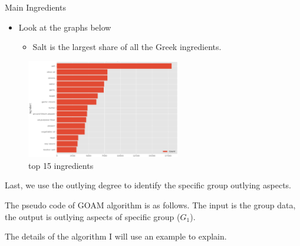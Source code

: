 \documentclass[
 size=14pt,
 paper=smartboard,  %
 mode=present, 		%
 display=slides, 	%
 style=tuliplab,  	%
 pauseslide,
 fleqn,leqno]{powerdot}
\begin{document}
\begin{slide}{Main Ingredients}
  \begin{itemize}
    \item
    Look at the graphs below 
    \begin{itemize}
      \item
      Salt is the largest share of all the Greek ingredients.
      
     
      \end{itemize}
    \end{itemize}
    
    \begin{figure}
      \centering
      \includegraphics[width=0.6\textwidth,natwidth=866,natheight=550]{figures/15.eps}
      \caption{top 15 ingredients}\label{Checking for outliers}
    \end{figure}
    
    \begin{note}
    Last,
    we use the outlying degree to identify the specific group outlying aspects.
    
    The pseudo code of GOAM algorithm is as follows.
    The input is the group data,
    the output is outlying aspects of specific group ($G_1$).
    
    The details of the algorithm I will use an example to explain.
    \end{note}

\end{slide}
\end{document}
